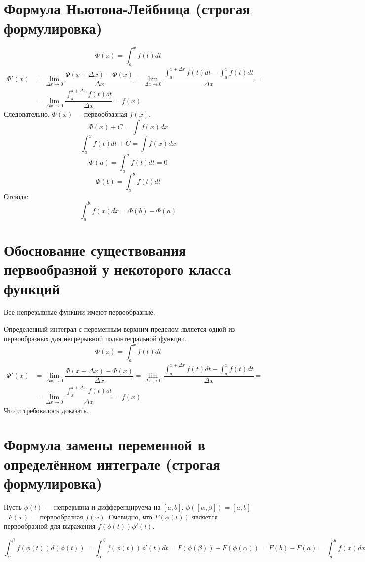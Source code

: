 \documentclass[12pt]{article}
\begin{document}
\section{Формула Ньютона-Лейбница (строгая формулировка)}
\[
    \Phi(x) = \int_a^x f(t)dt
\]
\[
    \begin{array}{ll}
        \Phi'(x) & = \lim_{\Delta x \rightarrow 0} \dfrac{\Phi(x + \Delta x) - \Phi(x)}{\Delta x}
        = \lim_{\Delta x \rightarrow 0} \dfrac{\int_a^{x + \Delta x} f(t)dt - \int_a^x f(t)dt}{\Delta x} = \\
                 & = \lim_{\Delta x \rightarrow 0} \dfrac{\int_x^{x + \Delta x}f(t) dt}{\Delta x} = f(x)
    \end{array}
\]
Следовательно, $\Phi(x)$ — первообразная $f(x)$.
\[
    \Phi(x) + C = \int f(x)dx
\]
\[
    \int_a^xf(t)dt + C = \int f(x)dx
\]
\[
    \Phi(a) = \int_a^a f(t)dt = 0
\]
\[
    \Phi(b) = \int_a^b f(t)dt
\]
Отсюда:
\[
    \int_a^b f(x)dx = \Phi(b) - \Phi(a)
\]

\section{Обоснование существования первообразной у некоторого класса функций}
Все непрерывные функции имеют первообразные.

Определенный интеграл с переменным верхним пределом является одной из первообразных для непрерывной подынтегральной функции.
\[
    \Phi(x) = \int_a^x f(t)dt
\]
\[
    \begin{array}{ll}
        \Phi'(x) & = \lim_{\Delta x \rightarrow 0} \dfrac{\Phi(x + \Delta x) - \Phi(x)}{\Delta x}
        = \lim_{\Delta x \rightarrow 0} \dfrac{\int_a^{x + \Delta x} f(t)dt - \int_a^x f(t)dt}{\Delta x} = \\
                 & = \lim_{\Delta x \rightarrow 0} \dfrac{\int_x^{x + \Delta x}f(t) dt}{\Delta x} = f(x)
    \end{array}
\]
Что и требовалось доказать.

\section{Формула замены переменной в определённом интеграле (строгая формулировка)}
Пусть $\phi(t)$ — непрерывна и дифференцируема на $[a,b]$. $\phi([\alpha, \beta]) = [a, b]$. $F(x)$ — первообразная $f(x)$. Очевидно, что $F(\phi(t))$ является первообразной для выражения $f(\phi(t))\phi'(t)$.

\[
    \int_\alpha^\beta f(\phi(t))d(\phi(t)) = \int_\alpha^\beta f(\phi(t))\phi'(t)dt = F(\phi(\beta)) - F(\phi(\alpha)) = F(b) - F(a) = \int_a^b f(x)dx
\]
\end{document}
